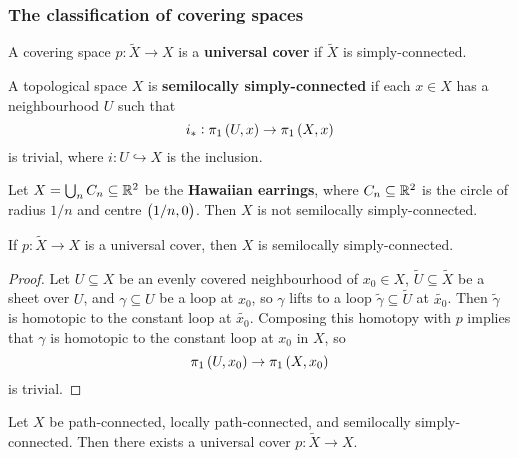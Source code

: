 
\subsubsection{The classification of covering spaces}

\begin{definition*}
A covering space $ p : \widetilde{X} \to X $ is a \textbf{universal cover} if $ \widetilde{X} $ is simply-connected.
\end{definition*}

\begin{definition*}
A topological space $ X $ is \textbf{semilocally simply-connected} if each $ x \in X $ has a neighbourhood $ U $ such that
$$ i_* : \pi_1\br{U, x} \to \pi_1\br{X, x} $$
is trivial, where $ i : U \hookrightarrow X $ is the inclusion.
\end{definition*}

\begin{example*}
Let $ X = \bigcup_n C_n \subseteq \mathbb{R}^2 $ be the \textbf{Hawaiian earrings}, where $ C_n \subseteq \mathbb{R}^2 $ is the circle of radius $ 1 / n $ and centre $ \br{1 / n, 0} $. Then $ X $ is not semilocally simply-connected.
\end{example*}

\begin{proposition}
If $ p : \widetilde{X} \to X $ is a universal cover, then $ X $ is semilocally simply-connected.
\end{proposition}

\begin{proof}
Let $ U \subseteq X $ be an evenly covered neighbourhood of $ x_0 \in X $, $ \widetilde{U} \subseteq \widetilde{X} $ be a sheet over $ U $, and $ \gamma \subseteq U $ be a loop at $ x_0 $, so $ \gamma $ lifts to a loop $ \widetilde{\gamma} \subseteq \widetilde{U} $ at $ \widetilde{x_0} $. Then $ \widetilde{\gamma} $ is homotopic to the constant loop at $ \widetilde{x_0} $. Composing this homotopy with $ p $ implies that $ \gamma $ is homotopic to the constant loop at $ x_0 $ in $ X $, so
$$ \pi_1\br{U, x_0} \to \pi_1\br{X, x_0} $$
is trivial.
\end{proof}

\pagebreak

\begin{theorem}
Let $ X $ be path-connected, locally path-connected, and semilocally simply-connected. Then there exists a universal cover $ p : \widetilde{X} \to X $.
\end{theorem}

